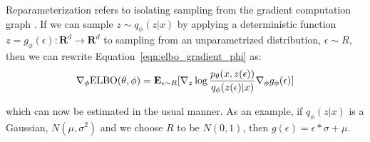 Reparameterization refers to isolating sampling from the gradient computation graph \cite{kingma2013auto,rezende2014stochastic}. If we can sample $z \sim q_\phi(z|x)$ by applying a deterministic function $z = g_\phi(\epsilon): \mathbf{R}^{d} \rightarrow \mathbf{R}^{d}$ to sampling from an unparametrized distribution, $\epsilon \sim R$, then we can rewrite Equation~\ref{eqn:elbo_gradient_phi} as:
\begin{equation}
    \nabla_\phi \textup{ELBO}(\theta, \phi) = \mathbf{E}_{\epsilon \sim R}[\nabla_z \log\frac{p_\theta(x,z(\epsilon))}{q_\phi(z(\epsilon)|x)} \nabla_\phi g_\phi(\epsilon)]
\label{eqn:gradient_reparam}
\end{equation}

which can now be estimated in the usual manner. As an example, if $q_\phi(z|x)$ is a Gaussian, $N(\mu, \sigma^2)$ and we choose $R$ to be $N(0, 1)$, then $g(\epsilon) = \epsilon * \sigma + \mu$.






